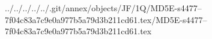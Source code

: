 ../../../../../.git/annex/objects/JF/1Q/MD5E-s4477--7f04c83a7c9e0a977b5a79d3b211cd61.tex/MD5E-s4477--7f04c83a7c9e0a977b5a79d3b211cd61.tex